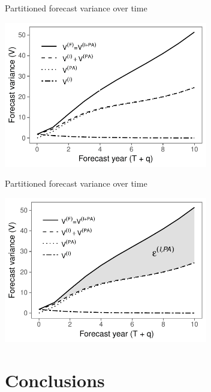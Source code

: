 \documentclass[12pt, compress, aspectratio=1610]{beamer}
\begin{document}
\begin{frame}{%
\protect\hypertarget{partitioned-forecast-variance-over-time}{%
Partitioned forecast variance over time}}

\centering

\includegraphics[height=2.5in]{./figures/example_interaction_effect_norib.pdf}

\end{frame}

\begin{frame}{%
\protect\hypertarget{partitioned-forecast-variance-over-time-1}{%
Partitioned forecast variance over time}}

\centering

\includegraphics[height=2.5in]{./figures/example_interaction_effect.pdf}

\end{frame}

\hypertarget{conclusions}{%
\section{Conclusions}\label{conclusions}}
\end{document}
